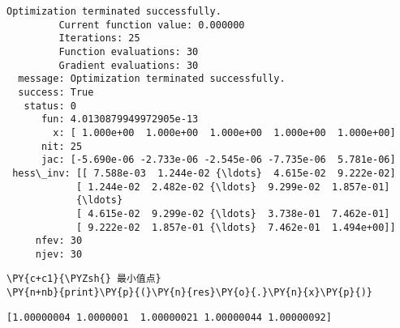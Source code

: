     \begin{Verbatim}[commandchars=\\\{\}]
Optimization terminated successfully.
         Current function value: 0.000000
         Iterations: 25
         Function evaluations: 30
         Gradient evaluations: 30
  message: Optimization terminated successfully.
  success: True
   status: 0
      fun: 4.0130879949972905e-13
        x: [ 1.000e+00  1.000e+00  1.000e+00  1.000e+00  1.000e+00]
      nit: 25
      jac: [-5.690e-06 -2.733e-06 -2.545e-06 -7.735e-06  5.781e-06]
 hess\_inv: [[ 7.588e-03  1.244e-02 {\ldots}  4.615e-02  9.222e-02]
            [ 1.244e-02  2.482e-02 {\ldots}  9.299e-02  1.857e-01]
            {\ldots}
            [ 4.615e-02  9.299e-02 {\ldots}  3.738e-01  7.462e-01]
            [ 9.222e-02  1.857e-01 {\ldots}  7.462e-01  1.494e+00]]
     nfev: 30
     njev: 30
    \end{Verbatim}

    \begin{tcolorbox}[breakable, size=fbox, boxrule=1pt, pad at break*=1mm,colback=cellbackground, colframe=cellborder]
\begin{Verbatim}[commandchars=\\\{\}]
\PY{c+c1}{\PYZsh{} 最小值点}
\PY{n+nb}{print}\PY{p}{(}\PY{n}{res}\PY{o}{.}\PY{n}{x}\PY{p}{)}
\end{Verbatim}
\end{tcolorbox}

    \begin{Verbatim}[commandchars=\\\{\}]
[1.00000004 1.0000001  1.00000021 1.00000044 1.00000092]
    \end{Verbatim}

